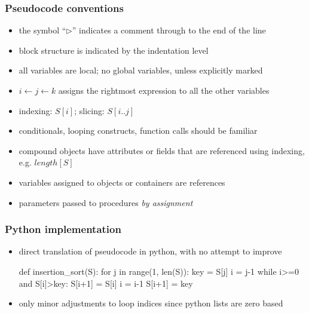 \begin{frame}[fragile]
%
  \frametitle{Pseudocode conventions}
%
  \begin{itemize}
  \item the symbol ``$\triangleright$'' indicates a comment through to the end of the line
  \item block structure is indicated by the indentation level
  \item all variables are local; no global variables, unless explicitly marked
  \item $i \leftarrow j \leftarrow k$ assigns the rightmost expression to all the other
    variables
  \item indexing: $S[i]$; slicing: $S[i .. j]$
  \item conditionals, looping constructs, function calls should be familiar
  \item compound objects have attributes or fields that are referenced using indexing,
    e.g. $length[S]$
  \item variables assigned to objects or containers are references
  \item parameters passed to procedures {\em by assignment}
  \end{itemize}
%
\end{frame}
        
\begin{frame}[fragile]
%
  \frametitle{Python implementation}
%
  \begin{itemize}
%
  \item direct translation of pseudocode in python, with no attempt to improve
%
  \begin{center}
    \begin{minipage}[h]{.75\linewidth}
      \begin{python}[%
        label={lst:insertion-sort:python},
        caption={Python implementation of insertion\_sort}
]
%
def insertion_sort(S):
    for j in range(1, len(S)):
        key = S[j]
        i = j-1
        while i>=0 and S[i]>key:
            S[i+1] = S[i]
            i = i-1
        S[i+1] = key
      \end{python}
    \end{minipage}
  \end{center}
%
  \item only minor adjustments to loop indices since python lists are zero based
  \end{itemize}
%
\end{frame}

